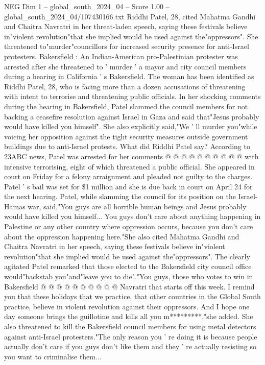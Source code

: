 \begin{textsample}{NEG Dim 1 – global\_south\_2024\_04 – Score 1.00 – global\_south\_2024\_04/107430166.txt}  \label{ex:f1_neg_302}
Riddhi Patel, 28, cited Mahatma Gandhi and Chaitra Navratri in her threat-laden speech, saying these festivals believe in"violent revolution"that she implied would be used against the"oppressors".
She threatened to"murder"councillors for increased security presence for anti-Israel protesters.
Bakersfield : An Indian-American pro-Palestinian protester was arrested after she threatened to ' murder ' a mayor and city council members during a hearing in California ' s Bakersfield.
The woman has been identified as Riddhi Patel, 28, who is facing more than a dozen accusations of threatening with intent to terrorise and threatening public officials.
In her shocking comments during the hearing in Bakersfield, Patel slammed the council members for not backing a ceasefire resolution against Israel in Gaza and said that"Jesus probably would have killed you himself".
She also explicitly said,"We ' ll murder you"while voicing her opposition against the tight security measures outside government buildings due to anti-Israel protests.
What did Riddhi Patel say?
According to 23ABC news, Patel was arrested for her comments @ @ @ @ @ @ @ @ @ @ with intensive terrorising, eight of which threatened a public official.
She appeared in court on Friday for a felony arraignment and pleaded not guilty to the charges.
Patel ' s bail was set for \$1 million and she is due back in court on April 24 for the next hearing.
Patel, while slamming the council for its position on the Israel-Hamas war, said,"You guys are all horrible human beings and Jesus probably would have killed you himself...
You guys don't care about anything happening in Palestine or any other country where oppression occurs, because you don't care about the oppression happening here."She also cited Mahatma Gandhi and Chaitra Navratri in her speech, saying these festivals believe in"violent revolution"that she implied would be used against the"oppressors".
The clearly agitated Patel remarked that those elected to the Bakersfield city council office would"backstab you"and"leave you to die"."You guys, those who votes to win in Bakersfield @ @ @ @ @ @ @ @ @ @ Navratri that starts off this week.
I remind you that these holidays that we practice, that other countries in the Global South practice, believe in violent revolution against their oppressors.
And I hope one day someone brings the guillotine and kills all you m*********,"she added.
She also threatened to kill the Bakersfield council members for using metal detectors against anti-Israel protesters."The only reason you ' re doing it is because people actually don't care if you guys don't like them and they ' re actually resisting so you want to criminalise them...

\end{textsample}
